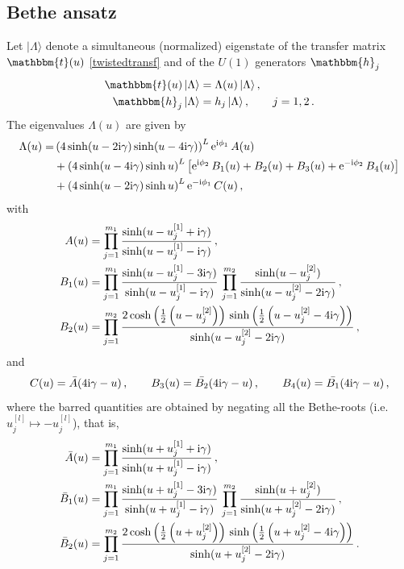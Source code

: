 \documentclass[12pt]{article}
\numberwithin{equation}{section}
\newcommand{\ri}{{\rm i}}
\newcommand{\re}{{\rm e}}
\begin{document}
	\subsection{Bethe ansatz}
	
	
	Let $|\Lambda\rangle$ denote a simultaneous (normalized) eigenstate of the transfer matrix
	$\mathbbm{t}(u)$ \eqref{twistedtransf}
	and of the $U(1)$ generators $\mathbbm{h}_j$
	\begin{align}
		\mathbbm{t}(u)\, |\Lambda\rangle & = \Lambda(u)\,  |\Lambda\rangle \,, \label{simult1} \\
		\mathbbm{h}_j\, |\Lambda\rangle & = h_j\,  |\Lambda\rangle \,, \qquad j = 1, 2\,.
		\label{simult2}
	\end{align}
	The eigenvalues $\Lambda(u)$ are given by
	\begin{align}
		\Lambda(u) =& \left(4\sinh(u-2\ri \gamma)\sinh(u-4\ri \gamma)\right)^{L} \re^{\ri \phi_1}\, A(u) \nonumber \\
		&+ \left(4 \sinh(u-4\ri \gamma) \sinh u\right)^L \left[ \re^{\ri \phi_2}\, B_1(u) + B_2(u) + B_3(u) + \re^{-\ri \phi_2}\, B_4(u) \right] \nonumber\\
		&+ \left(4\sinh(u-2\ri \gamma)\sinh u\right)^{L} \re^{-\ri \phi_1}\, C(u) \,,
		\label{TQtwist}
	\end{align}
	with 
	\begin{equation}
		\label{AB1B2}
		\begin{aligned}
			A(u) &= \prod_{j=1}^{m_1} \frac{\sinh(u-u^{[1]}_j+\ri \gamma)}{\sinh(u-u^{[1]}_j-\ri \gamma)}\,,\\
			B_1(u) &= \prod_{j=1}^{m_1}
			\frac{\sinh(u-u^{[1]}_j-3\ri \gamma)}{\sinh(u-u^{[1]}_j-\ri \gamma)}\,
			\prod_{j=1}^{m_2}\frac{\sinh(u-u^{[2]}_j)}{\sinh(u-u^{[2]}_j-2\ri \gamma)}\,, \\
			B_2(u) &      = \prod_{j=1}^{m_2} \frac{2\cosh\left(\frac{1}{2}\left(u-u^{[2]}_j\right)\right)\,\sinh\left(\frac{1}{2}\left(u-u^{[2]}_j-4\ri \gamma\right)\right)}{\sinh(u-u^{[2]}_j-2\ri \gamma)}\,,
		\end{aligned}
	\end{equation}
	and
	\begin{equation}
		C(u)=\bar{A}(4\ri \gamma-u)\,, \qquad
		B_3(u)=\bar{B_2}(4\ri \gamma-u)\,, \qquad
		B_4(u)=\bar{B_1}(4\ri \gamma-u)\,, 
		\label{CB3B4}
	\end{equation}
	where the barred quantities are obtained by negating all the Bethe-roots (i.e. $u^{[l]}_j \mapsto -u^{[l]}_j$), that is,
	\begin{equation}
		\begin{aligned}
			\bar{A}(u) &= \prod_{j=1}^{m_1} \frac{\sinh(u+u^{[1]}_j+\ri \gamma)}{\sinh(u+u^{[1]}_j-\ri \gamma)}\,,\\
			\bar{B}_1(u) &= \prod_{j=1}^{m_1}
			\frac{\sinh(u+u^{[1]}_j-3\ri \gamma)}{\sinh(u+u^{[1]}_j-\ri \gamma)}\,
			\prod_{j=1}^{m_2}\frac{\sinh(u+u^{[2]}_j)}{\sinh(u+u^{[2]}_j-2\ri \gamma)}\,, \\
			\bar{B}_2(u) &      = \prod_{j=1}^{m_2} \frac{2\cosh\left(\frac{1}{2}\left(u+u^{[2]}_j\right)\right)\,\sinh\left(\frac{1}{2}\left(u+u^{[2]}_j-4\ri \gamma\right)\right)}{\sinh(u+u^{[2]}_j-2\ri \gamma)}\,.
		\end{aligned}
	\end{equation}
\end{document}
